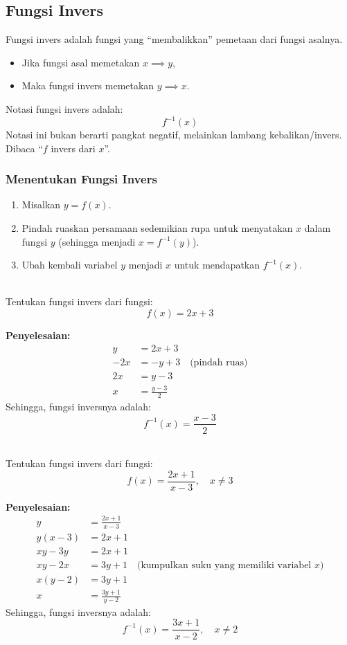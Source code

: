 \subsection{Fungsi Invers}
\begin{definition}
  Fungsi invers adalah fungsi yang ``membalikkan'' pemetaan dari fungsi asalnya.
  \begin{itemize}
  \item Jika fungsi asal memetakan $x \implies y$,
  \item Maka fungsi invers memetakan $y \implies x$.
  \end{itemize}
  Notasi fungsi invers adalah:
  \[ f^{-1}(x) \]
  Notasi ini bukan berarti pangkat negatif, melainkan lambang kebalikan/invers. Dibaca ``$f$ invers dari $x$''.
\end{definition}

\subsubsection{Menentukan Fungsi Invers}
\begin{enumerate}
\item Misalkan $y = f(x)$.
\item Pindah ruaskan persamaan sedemikian rupa untuk menyatakan $x$ dalam fungsi $y$ (sehingga menjadi $x = f^{-1}(y)$).
\item Ubah kembali variabel $y$ menjadi $x$ untuk mendapatkan $f^{-1}(x)$.
\end{enumerate}

\begin{example}
  \hfill \\
  Tentukan fungsi invers dari fungsi:
  \[f(x) = 2x + 3\]
  
  \textbf{Penyelesaian:}
  \[\begin{aligned}     y &= 2x + 3 \\     -2x &= -y + 3 \quad \text{(pindah ruas)} \\     2x &= y - 3 \\     x &= \frac{y - 3}{2}   \end{aligned}\]
  Sehingga, fungsi inversnya adalah:
  \[f^{-1}(x) = \frac{x - 3}{2}\]
\end{example}

\begin{example}
  \hfill \\
  Tentukan fungsi invers dari fungsi:
  \[f(x) = \frac{2x + 1}{x - 3}, \quad x \ne 3\]
  
  \textbf{Penyelesaian:}
  \[\begin{aligned}     y &= \frac{2x + 1}{x - 3} \\     y(x - 3) &= 2x + 1 \\     xy - 3y &= 2x + 1 \\     xy - 2x &= 3y + 1 \quad \text{(kumpulkan suku yang memiliki variabel } x \text{)} \\     x(y - 2) &= 3y + 1 \\     x &= \frac{3y + 1}{y - 2}   \end{aligned}\]
  Sehingga, fungsi inversnya adalah:
  \[f^{-1}(x) = \frac{3x + 1}{x - 2}, \quad x \ne 2\]
\end{example}

